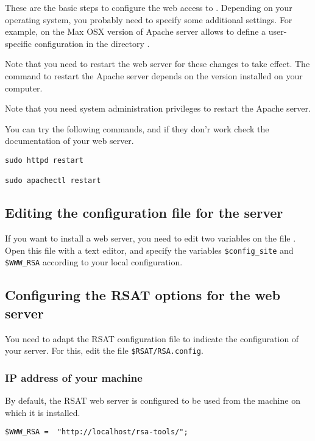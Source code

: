 \documentclass{article}
\begin{document}
These are the basic steps to configure the web access to
\RSAT. Depending on your operating system, you probably need to
specify some additional settings. For example, on the Max OSX version
of Apache server allows to define a user-specific configuration in the
directory .

Note that you need to restart the web server for these changes to take
effect. The command to restart the Apache server depends on the
version installed on your computer. 

Note that you need system administration privileges to restart the
Apache server.

You can try the following commands, and if they don'r work check the
documentation of your web server.

\begin{verbatim}
sudo httpd restart

sudo apachectl restart
\end{verbatim}

\subsection{Editing the configuration file for the \RSAT server}

If you want to install a web server, you need to edit two variables on
the file . Open this file with a text editor, and
specify the variables \texttt{\$config\_site} and \texttt{\$WWW\_RSA}
according to your local configuration.


\subsection{Configuring the RSAT options for the web server}

You need to adapt the RSAT configuration file to indicate the
configuration of your server. For this, edit the file
\texttt{\$RSAT/RSA.config}.

\subsubsection{IP address of your machine}

By default, the RSAT web server is configured to be used from the
machine on which it is installed. 

\begin{verbatim}
$WWW_RSA = 	"http://localhost/rsa-tools/";
\end{verbatim}
\end{document}
